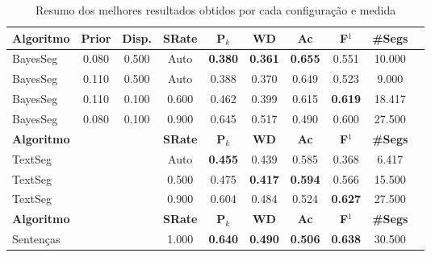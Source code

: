 \begin{table}[!h]
\begin{tabular}{|l||c|c|c|c|c|c|c|c|c|}
\hline
		\textbf{Algoritmo} &
		\textbf{Prior} &
		\textbf{Disp.} & 
		\textbf{SRate}& 
		\textbf{P$_k$} & 
		\textbf{WD} & 
		\textbf{Ac} & 
		\textbf{F$^1$} &
		\textbf{\#Segs} \\	\hline


 BayesSeg & 0.080 & 0.500 &  Auto & \cellcolor{gray!20} \textbf{0.380} & \cellcolor{gray!20} \textbf{0.361} & \cellcolor{gray!20} \textbf{0.655} 
		  & 0.551 & 10.000  \\ \hline 
 BayesSeg & 0.110 & 0.500 &  Auto & 0.388 & 0.370 & 0.649 
		  & 0.523 & 9.000  \\ \hline 
 BayesSeg & 0.110 & 0.100 & 0.600 & 0.462 & 0.399 & 0.615 
		  & \cellcolor{gray!20} \textbf{0.619} & 18.417  \\ \hline 
 BayesSeg & 0.080 & 0.100 & 0.900 & 0.645 & 0.517 & 0.490 
		  & 0.600 & 27.500  \\ \hline 

\hline
		\textbf{Algoritmo} &&&
		\textbf{SRate} & 
		\textbf{P$_k$} & 
		\textbf{WD} & 
		\textbf{Ac} & 
		\textbf{F$^1$} &
		\textbf{\#Segs} \\	\hline

TextSeg &&& Auto & \cellcolor{gray!20} \textbf{0.455} & 0.439 & 0.585 
		& 0.368 & 6.417  \\ \hline 
TextSeg &&& 0.500 & 0.475 & \cellcolor{gray!20} \textbf{0.417} & \cellcolor{gray!20} \textbf{0.594} 
		& 0.566 & 15.500  \\ \hline 
TextSeg &&& 0.900 & 0.604 & 0.484 & 0.524 
		& \cellcolor{gray!20} \textbf{0.627} & 27.500  \\ \hline 

\hline
		\textbf{Algoritmo} &&&
		\textbf{SRate} & 
		\textbf{P$_k$} & 
		\textbf{WD} & 
		\textbf{Ac} & 
		\textbf{F$^1$} &
		\textbf{\#Segs} \\	\hline


Sentenças &&& 1.000& \cellcolor{gray!20} \textbf{0.640} & \cellcolor{gray!20} \textbf{0.490} & \cellcolor{gray!20} \textbf{0.506} 
		   & \cellcolor{gray!20} \textbf{0.638} & 30.500  \\ \hline 



	\end{tabular}
	\caption{Resumo dos melhores resultados obtidos por cada configuração e medida}
	\label{tab:resumo-resultados}
\end{table}




















